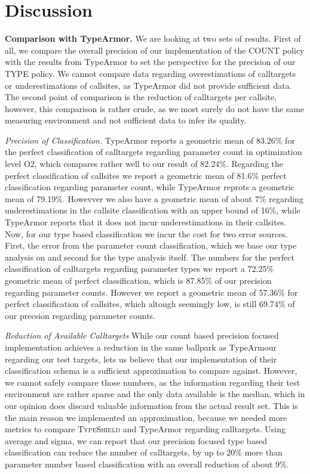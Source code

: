 \section{Discussion}
\label{chapter:Discussion}

\textbf{Comparison with TypeArmor.}
\label{section:comptype}
We are looking at two sets of results. First of all, we compare the overall precision of our implementation
of the COUNT policy with the results from TypeArmor to set the perspective for the precision of our TYPE 
policy. We cannot compare data regarding overestimations of calltargets or underestimations of callsites, 
as TypeArmor did not provide sufficient data. The second point of comparison is the reduction of calltargets
per callsite, however, this comparison is rather crude, as we most surely do not have the same measuring
environment and not sufficient data to infer its quality.

\textit{Precision of Classification.}
TypeArmor reports a geometric mean of 83.26\% for the perfect classification of calltargets regarding 
parameter count in optimization level O2, which compares rather well to our result of 82.24\%. Regarding
the perfect classification of callsites we report a geometric mean of 81.6\% perfect classification 
regarding parameter count, while TypeArmor reprots a geometric mean of 79.19\%. Howevver we also have
a geometric mean of about 7\% regarding underestimations in the callsite classification with an upper
bound of 16\%, while TypeArmor reports that it does not incur underestimations in their callsites.
Now, for our type based classification we incur the cost for two error sources. First, the error from
the parameter count classification, which we base our type analysis on and second for the type analysis
itself. The numbers for the perfect classification of calltargets regarding parameter types we report a
72.25\% geometric mean of perfect classification, which is 87.85\% of our precision regarding parameter
counts. However we report a geometric mean of 57.36\%
for perfect classification of callsites, which altough seemingly low, is still 69.74\% of our precsion
regarding parameter counts.

\textit{Reduction of Available Calltargets}
While our count based precision focused implementation achieves a reduction in the same ballpark as
TypeArmour regarding our test targets, lets us believe that our implementation of their classification
schema is a sufficient approximation to compare against. However, we cannot safely compare those numbers,
as the information regarding their test environment are rather sparse and the only data available is the
median, which in our opinion does discard valuable information from the actual result set. This is the
main reason we implemented an approximation, because we needed more metrics to compare \textsc{TypeShield}
and TypeArmor regarding calltargets. Using average and sigma, we can report that our precision focused
type based classification can reduce the number of calltargets, by up to 20\% more than parameter number
based classification with an overall reduction of about 9\%.



